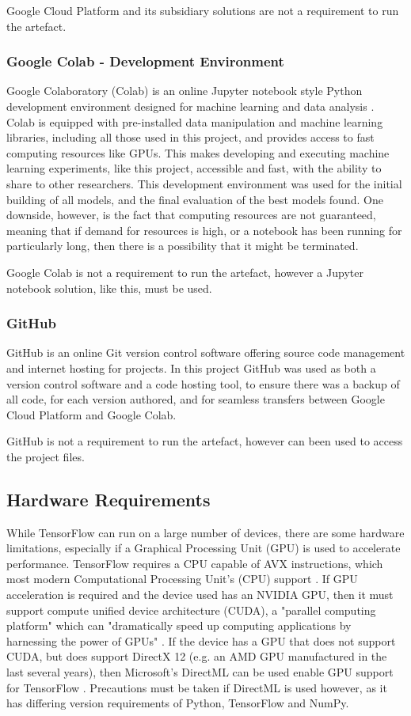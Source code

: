 Google Cloud Platform and its subsidiary solutions are not a requirement to run the artefact.

\subsubsection{Google Colab - Development Environment}
Google Colaboratory (Colab) is an online Jupyter notebook style Python development environment designed for machine learning and data analysis \citep{GoogleCo52:online}. Colab is equipped with pre-installed data manipulation and machine learning libraries, including all those used in this project, and provides access to fast computing resources like GPUs. This makes developing and executing machine learning experiments, like this project, accessible and fast, with the ability to share to other researchers. This development environment was used for the initial building of all models, and the final evaluation of the best models found. One downside, however, is the fact that computing resources are not guaranteed, meaning that if demand for resources is high, or a notebook has been running for particularly long, then there is a possibility that it might be terminated.  

Google Colab is not a requirement to run the artefact, however a Jupyter notebook solution, like this, must be used.

\subsubsection{GitHub}
GitHub is an online Git version control software offering source code management and internet hosting for projects. In this project GitHub was used as both a version control software and a code hosting tool, to ensure there was a backup of all code, for each version authored, and for seamless transfers between Google Cloud Platform and Google Colab.

GitHub is not a requirement to run the artefact, however can been used to access the project files.

\subsection{Hardware Requirements}
While TensorFlow can run on a large number of devices, there are some hardware limitations, especially if a Graphical Processing Unit (GPU) is used to accelerate performance. TensorFlow requires a CPU capable of AVX instructions, which most modern Computational Processing Unit's (CPU) support \citep{InstallT17:online}. If GPU acceleration is required and the device used has an NVIDIA GPU, then it must support compute unified device architecture (CUDA), a "parallel computing platform" which can "dramatically speed up computing applications by harnessing the power of GPUs" \citep{CUDAZone2:online}. If the device has a GPU that does not support CUDA, but does support DirectX 12 (e.g. an AMD GPU manufactured in the last several years), then Microsoft's DirectML can be used enable GPU support for TensorFlow \citep{Introduc93:online}. Precautions must be taken if DirectML is used however, as it has differing version requirements of Python, TensorFlow and NumPy.

